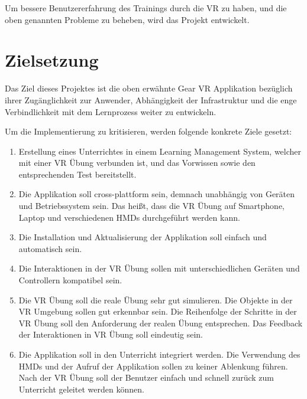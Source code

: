 Um bessere Benutzererfahrung des Trainings durch die VR zu haben, und die oben genannten Probleme zu beheben, wird das Projekt entwickelt.

\section{Zielsetzung}


Das Ziel dieses Projektes ist die oben erwähnte Gear VR Applikation bezüglich ihrer Zugänglichkeit zur Anwender, Abhängigkeit der Infrastruktur und die enge Verbindlichkeit mit dem Lernprozess weiter zu entwickeln.

Um die Implementierung zu kritisieren, werden folgende konkrete Ziele gesetzt:

\begin{enumerate}[labelsep=1ex]
	\renewcommand{\labelenumi}{\textbf{Z\theenumi.}}
	\item Erstellung eines Unterrichtes in einem Learning Management System, welcher mit einer VR Übung verbunden ist, und das Vorwissen sowie den entsprechenden Test bereitstellt.
	
	\item Die Applikation soll cross-plattform sein, demnach unabhängig von Geräten und Betriebssystem sein. Das heißt, dass die VR Übung auf Smartphone, Laptop und verschiedenen HMDs durchgeführt werden kann.
	
	\item Die Installation und Aktualisierung der Applikation soll einfach und automatisch sein.
	
	\item Die Interaktionen in der VR Übung sollen mit unterschiedlichen Geräten und Controllern kompatibel sein.
	
	\item Die VR Übung soll die reale Übung sehr gut simulieren. Die Objekte in der VR Umgebung sollen gut erkennbar sein. Die Reihenfolge der Schritte in der VR Übung soll den Anforderung der realen Übung entsprechen. Das Feedback der Interaktionen in VR Übung soll eindeutig sein.
	
	\item Die Applikation soll in den Unterricht integriert werden. Die Verwendung des HMDs und der Aufruf der Applikation sollen zu keiner Ablenkung führen. Nach der VR Übung soll der Benutzer einfach und schnell zurück zum Unterricht geleitet werden können.
	
\end{enumerate}

